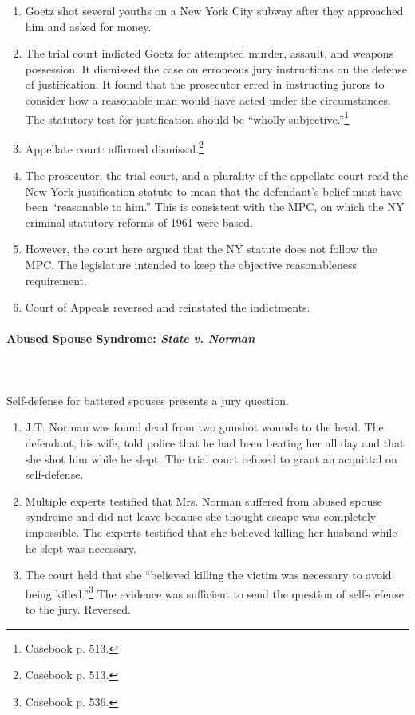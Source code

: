 \begin{enumerate}
    \item Goetz shot several youths on a New York City subway after they 
    approached him and asked for money.
    \item The trial court indicted Goetz for attempted murder, assault, and 
    weapons possession. It dismissed the case on erroneous jury instructions 
    on the defense of justification. It found that the prosecutor erred in 
    instructing jurors to consider how a reasonable man would have acted under 
    the circumstances. The statutory test for justification should be ``wholly 
    subjective.''\footnote{Casebook p. 513.}
    \item Appellate court: affirmed dismissal.\footnote{Casebook p. 513.}
    \item The prosecutor, the trial court, and a plurality of the appellate 
    court read the New York justification statute to mean that the defendant's 
    belief must have been ``reasonable to him.'' This is consistent with the 
    MPC, on which the NY criminal statutory reforms of 1961 were based.
    \item However, the court here argued that the NY statute does not follow 
    the MPC. The legislature intended to keep the objective reasonableness 
    requirement.
    \item Court of Appeals reversed and reinstated the indictments.
\end{enumerate}

\paragraph{Abused Spouse Syndrome: \emph{State v. Norman}}
~\\\\
Self-defense for battered spouses presents a jury question.

\begin{enumerate}
    \item J.T. Norman was found dead from two gunshot wounds to the head. The 
    defendant, his wife, told police that he had been beating her all day and 
    that she shot him while he slept. The trial court refused to grant an 
    acquittal on self-defense.
    \item Multiple experts testified that Mrs. Norman suffered from abused 
    spouse syndrome and did not leave because she thought escape was 
    completely impossible. The experts testified that she believed killing 
    her husband while he slept was necessary.
    \item The court held that she ``believed killing the victim was necessary 
    to avoid being killed.''\footnote{Casebook p. 536.} The evidence was 
    sufficient to send the question of self-defense to the jury. Reversed.
\end{enumerate}

